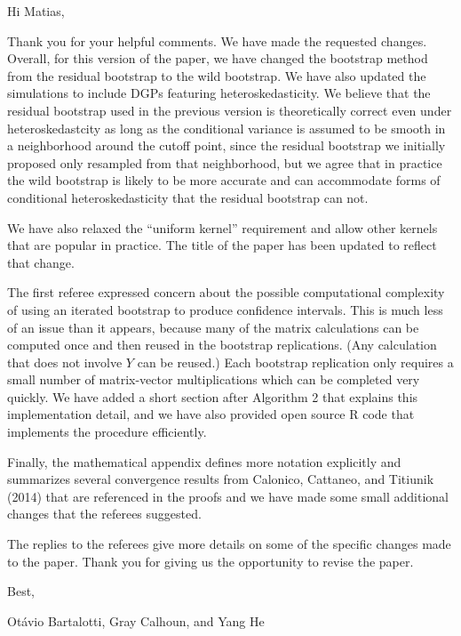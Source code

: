 \documentclass[12pt,fleqn]{article}
\begin{document}
\noindent%
Hi Matias,

Thank you for your helpful comments. We have made the requested changes. Overall,
for this version of the paper, we have changed the bootstrap method from the
residual bootstrap to the wild bootstrap. We have also updated the simulations
to include DGPs featuring heteroskedasticity. We believe that the residual
bootstrap used in the previous version is theoretically correct even under
heteroskedastcity as long as the conditional variance is assumed to be smooth in
a neighborhood around the cutoff point, since the residual bootstrap we initially
proposed only resampled from that neighborhood, but we agree that in practice
the wild bootstrap is likely to be more accurate and can accommodate forms of
conditional heteroskedasticity that the residual bootstrap can not.

We have also relaxed the ``uniform kernel'' requirement and allow other kernels
that are popular in practice. The title of the paper has been updated to reflect
that change.

The first referee expressed concern about the possible computational complexity of
using an iterated bootstrap to produce confidence intervals. This is much less
of an issue than it appears, because many of the matrix calculations can be
computed once and then reused in the bootstrap replications. (Any calculation
that does not involve $Y$ can be reused.) Each bootstrap replication only
requires a small number of matrix-vector multiplications which can be completed
very quickly. We have added a short section after Algorithm 2 that explains
this implementation detail, and we have also provided open source R code that
implements the procedure efficiently.

Finally, the mathematical appendix defines more notation explicitly and
summarizes several convergence results from Calonico, Cattaneo, and Titiunik
(2014) that are referenced in the proofs and we have made some small additional
changes that the referees suggested.

The replies to the referees give more details on some of the specific
changes made to the paper. Thank you for giving us the opportunity to revise
the paper.

\strut

\noindent%
Best,

\noindent%
Ot\'avio Bartalotti, Gray Calhoun, and Yang He
\end{document}
